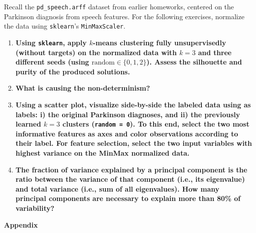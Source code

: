 \documentclass[12pt]{article}
\begin{document}
Recall the \texttt{pd\_speech.arff} dataset from earlier homeworks, centered on
the Parkinson diagnosis from speech features. For the following exercises, normalize
the data using \texttt{sklearn}'s \texttt{MinMaxScaler}.

\begin{enumerate}[leftmargin=\labelsep,resume]

  \item \textbf{Using \texttt{sklearn}, apply $k$-means clustering fully unsupervisedly
          (without targets) on the normalized data with $k = 3$ and three different seeds
          (using $\text{random} \in \{0, 1, 2\}$). Assess the silhouette and purity of the produced solutions.}

  \item \textbf{What is causing the non-determinism?}

  \item \textbf{Using a scatter plot, visualize side-by-side the labeled data using as labels: i) the original
          Parkinson diagnoses, and ii) the previously learned $k = 3$ clusters (\texttt{random = 0}). To this end, select
          the two most informative features as axes and color observations according to their label. For feature
          selection, select the two input variables with highest variance on the MinMax normalized data.}

  \item \textbf{The fraction of variance explained by a principal component is the ratio between the
          variance of that component (i.e., its eigenvalue) and total variance (i.e., sum of all eigenvalues).
          How many principal components are necessary to explain more than 80\% of variability?}

\end{enumerate}

\pagebreak

\large{\textbf{Appendix}\vskip 0.3cm}


\end{document}
